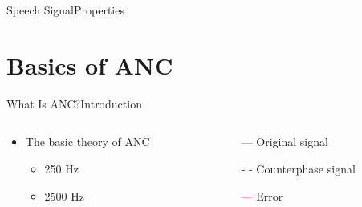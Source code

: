 \begin{frame}{Speech Signal}{Properties}
\section{Basics of ANC}
\begin{frame}{What Is ANC?}{Introduction}		
	\begin{columns}
		\begin{column}{0.5\textwidth}
				\begin{itemize}
					\item The basic theory of ANC
					\begin{itemize}
						\item  250 Hz
						\item 2500 Hz 
					\end{itemize}	
				\end{itemize}
			\vspace{-2.5mm}	
		\begin{center}
	 		
	 	\end{center}
		\end{column}
		\begin{column}{0.5\textwidth} 
			\begin{itemize}
				\item[\textcolor{MATLABblue}{---}] Original signal
				\item[\textcolor{MATLABblue}{- -}] Counterphase signal
				\item[\textcolor{red}{---}] Error
			\end{itemize}
		\begin{center}
	 		
	 	\end{center}
		\end{column}
	\end{columns}
\end{frame}


\end{frame}
